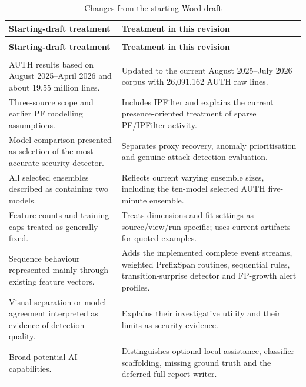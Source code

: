 \documentclass[11pt,a4paper]{article}
\begin{document}
\begingroup
\small
\begin{longtable}{>{\RaggedRight\arraybackslash}p{}>{\RaggedRight\arraybackslash}p{}}
\caption{Changes from the starting Word draft}\label{tab:13}\\
\toprule
\rowcolor{pale} \textbf{Starting-draft treatment} & \textbf{Treatment in this revision} \\
\midrule
\endfirsthead
\multicolumn{2}{l}{\small\itshape Table \thetable{} --- continued}\\
\toprule
\rowcolor{pale} \textbf{Starting-draft treatment} & \textbf{Treatment in this revision} \\
\midrule
\endhead
\midrule
\multicolumn{2}{r}{\footnotesize Continued on the next page}\\
\endfoot
\bottomrule
\endlastfoot
AUTH results based on August 2025--April 2026 and about 19.55 million lines. & Updated to the current August 2025--July 2026 corpus with 26,091,162 AUTH raw lines. \\[3pt]
Three-source scope and earlier PF modelling assumptions. & Includes IPFilter and explains the current presence-oriented treatment of sparse PF/IPFilter activity. \\[3pt]
Model comparison presented as selection of the most accurate security detector. & Separates proxy recovery, anomaly prioritisation and genuine attack-detection evaluation. \\[3pt]
All selected ensembles described as containing two models. & Reflects current varying ensemble sizes, including the ten-model selected AUTH five-minute ensemble. \\[3pt]
Feature counts and training caps treated as generally fixed. & Treats dimensions and fit settings as source/view/run-specific; uses current artifacts for quoted examples. \\[3pt]
Sequence behaviour represented mainly through existing feature vectors. & Adds the implemented complete event streams, weighted PrefixSpan routines, sequential rules, transition-surprise detector and FP-growth alert profiles. \\[3pt]
Visual separation or model agreement interpreted as evidence of detection quality. & Explains their investigative utility and their limits as security evidence. \\[3pt]
Broad potential AI capabilities. & Distinguishes optional local assistance, classifier scaffolding, missing ground truth and the deferred full-report writer. \\[3pt]

\end{longtable}
\end{document}
